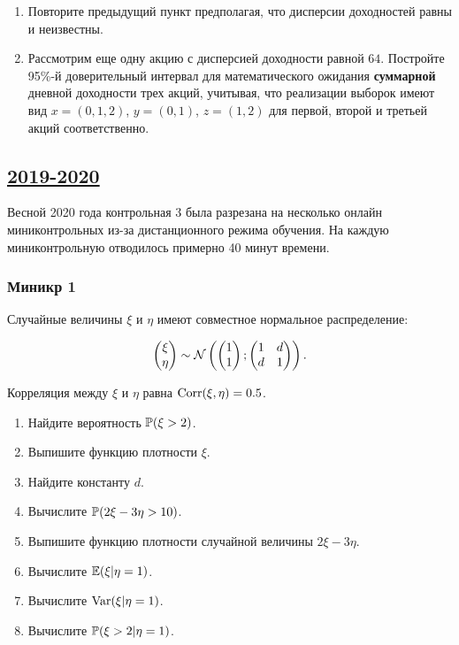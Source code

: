 \begin{enumerate}
\begin{enumerate}
\item Повторите предыдущий пункт предполагая, что дисперсии доходностей равны и неизвестны.

\item Рассмотрим еще одну акцию с дисперсией доходности равной $64$. 
Постройте 95\%-й доверительный интервал для математического ожидания \textbf{суммарной} дневной доходности трех акций, учитывая, 
что реализации выборок имеют вид $x=(0, 1, 2)$, $y=(0, 1)$, $z = (1, 2)$ для первой, второй и третьей акций соответственно.

\end{enumerate}
\end{enumerate}
  






\subsection[2019-2020]{\hyperref[sec:sol_kr_03_2019_2020]{2019-2020}}
\label{sec:kr_03_2019_2020}

Весной 2020 года контрольная 3 была разрезана на несколько онлайн миниконтрольных из-за дистанционного режима обучения.
На каждую миниконтрольную отводилось примерно 40 минут времени. 

\subsubsection*{Миникр 1}

Случайные величины $\xi$ и $\eta$ имеют совместное нормальное распределение:

\[
\begin{pmatrix}
  \xi \\
  \eta \\
\end{pmatrix}   \sim 
\cN \left(
\begin{pmatrix}
1 \\
1 \\
\end{pmatrix};
\begin{pmatrix}
  1 & d \\
  d & 1 \\
\end{pmatrix}
\right).
\]

Корреляция между $\xi$ и $\eta$ равна $\Corr(\xi, \eta)= 0.5$.


\begin{enumerate}
\item Найдите вероятность $\P(\xi > 2)$.
\item Выпишите функцию плотности $\xi$.
\item Найдите константу $d$. 
\item Вычислите $\P(2\xi -3\eta >10)$.
\item Выпишите функцию плотности случайной величины $2\xi -3\eta$.
\item Вычислите $\E(\xi |\eta = 1)$.
\item Вычислите $\Var(\xi |\eta = 1)$.
\item Вычислите $\P(\xi > 2 |\eta = 1)$.
\end{enumerate}


